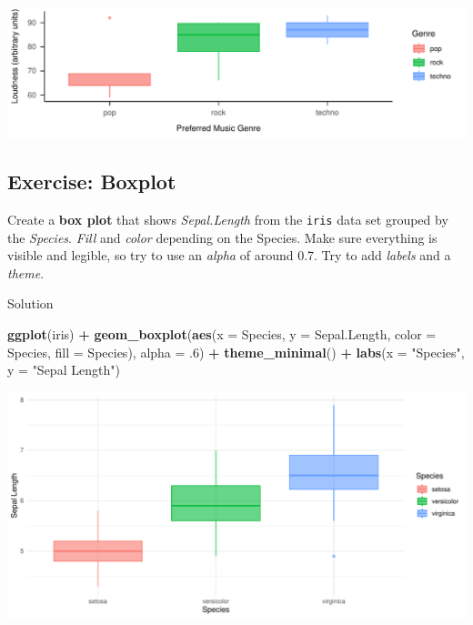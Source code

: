 \documentclass[
]{book}
\newenvironment{Shaded}{\begin{snugshade}}{\end{snugshade}}
\newcommand{\AttributeTok}[1]{\textcolor[rgb]{0.13,0.29,0.53}{#1}}
\newcommand{\DecValTok}[1]{\textcolor[rgb]{0.00,0.00,0.81}{#1}}
\newcommand{\FunctionTok}[1]{\textcolor[rgb]{0.13,0.29,0.53}{\textbf{#1}}}
\newcommand{\NormalTok}[1]{#1}
\newcommand{\SpecialCharTok}[1]{\textcolor[rgb]{0.81,0.36,0.00}{\textbf{#1}}}
\newcommand{\StringTok}[1]{\textcolor[rgb]{0.31,0.60,0.02}{#1}}
\begin{document}
\includegraphics{_main_files/figure-html/unnamed-chunk-37-1.pdf}

\subsection{Exercise: Boxplot}\label{exercise-boxplot}

Create a \textbf{box plot} that shows \emph{Sepal.Length} from the \texttt{iris} data set grouped by the \emph{Species}.
\emph{Fill} and \emph{color} depending on the Species.
Make sure everything is visible and legible, so try to use an \emph{alpha} of around 0.7.
Try to add \emph{labels} and a \emph{theme}.

Solution

\begin{Shaded}
\begin{Highlighting}[]
\FunctionTok{ggplot}\NormalTok{(iris) }\SpecialCharTok{+} 
  \FunctionTok{geom\_boxplot}\NormalTok{(}\FunctionTok{aes}\NormalTok{(}\AttributeTok{x =}\NormalTok{ Species, }\AttributeTok{y =}\NormalTok{ Sepal.Length,}
                   \AttributeTok{color =}\NormalTok{ Species, }\AttributeTok{fill =}\NormalTok{ Species), }\AttributeTok{alpha =}\NormalTok{ .}\DecValTok{6}\NormalTok{) }\SpecialCharTok{+}
  \FunctionTok{theme\_minimal}\NormalTok{() }\SpecialCharTok{+} \FunctionTok{labs}\NormalTok{(}\AttributeTok{x =} \StringTok{"Species"}\NormalTok{, }\AttributeTok{y =} \StringTok{"Sepal Length"}\NormalTok{)}
\end{Highlighting}
\end{Shaded}

\begin{flushleft}\includegraphics{_main_files/figure-html/unnamed-chunk-38-1} \end{flushleft}
\end{document}
